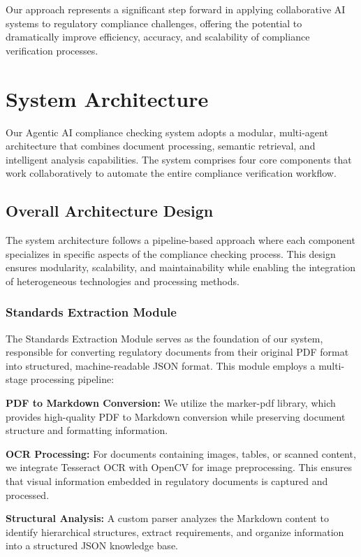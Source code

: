 \documentclass[conference]{IEEEtran}
\begin{document}
Our approach represents a significant step forward in applying collaborative AI systems to regulatory compliance challenges, offering the potential to dramatically improve efficiency, accuracy, and scalability of compliance verification processes.

\section{System Architecture}

Our Agentic AI compliance checking system adopts a modular, multi-agent architecture that combines document processing, semantic retrieval, and intelligent analysis capabilities. The system comprises four core components that work collaboratively to automate the entire compliance verification workflow.

\subsection{Overall Architecture Design}

The system architecture follows a pipeline-based approach where each component specializes in specific aspects of the compliance checking process. This design ensures modularity, scalability, and maintainability while enabling the integration of heterogeneous technologies and processing methods.

\subsubsection{Standards Extraction Module}
The Standards Extraction Module serves as the foundation of our system, responsible for converting regulatory documents from their original PDF format into structured, machine-readable JSON format. This module employs a multi-stage processing pipeline:

\textbf{PDF to Markdown Conversion:} We utilize the marker-pdf library, which provides high-quality PDF to Markdown conversion while preserving document structure and formatting information.

\textbf{OCR Processing:} For documents containing images, tables, or scanned content, we integrate Tesseract OCR with OpenCV for image preprocessing. This ensures that visual information embedded in regulatory documents is captured and processed.

\textbf{Structural Analysis:} A custom parser analyzes the Markdown content to identify hierarchical structures, extract requirements, and organize information into a structured JSON knowledge base.
\end{document}

